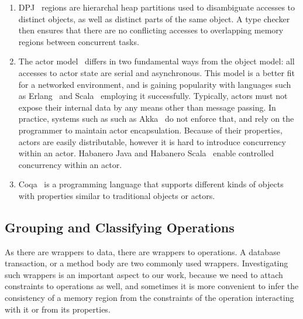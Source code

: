 \documentclass[]{usiinfprospectus}
\begin{document}
\begin{enumerate}
	\item DPJ~\cite{bocchino2009parallel} regions are hierarchal heap partitions used to disambiguate accesses to distinct objects, as well as distinct parts of the same object. A type checker then ensures that there are no conflicting accesses to overlapping memory regions between concurrent tasks. 
	\item The actor model~\cite{agha1985actors} differs in two fundamental ways from the object model: all accesses to actor state are serial and asynchronous. This model is a better fit for a networked environment, and is gaining popularity with languages such as Erlang~\cite{armstrong1993concurrent} and Scala~\cite{odersky2004overview}  employing it successfully. Typically, actors must not expose their internal data by any means other than message passing. In practice, systems such as such as Akka~\cite{akka} do not enforce that, and rely on the programmer to maintain actor encapsulation. Because of their properties, actors are easily distributable, however it is hard to introduce concurrency within an actor. Habanero Java and Habanero Scala~\cite{imam2012integrating} enable controlled concurrency within an actor. 
	\item Coqa~\cite{liu2008coqa} is a programming language that supports different kinds of objects with properties similar to traditional objects or actors.
\end{enumerate}

\subsection{Grouping and Classifying Operations}
As there are wrappers to data, there are wrappers to operations. A database transaction, or a method body are two commonly used wrappers. Investigating such wrappers is an important aspect to our work, because we need to attach constraints to operations as well, and sometimes it is more convenient to infer the consistency of a memory region from the constraints of the operation interacting with it or from its properties. 
 
\end{document}
